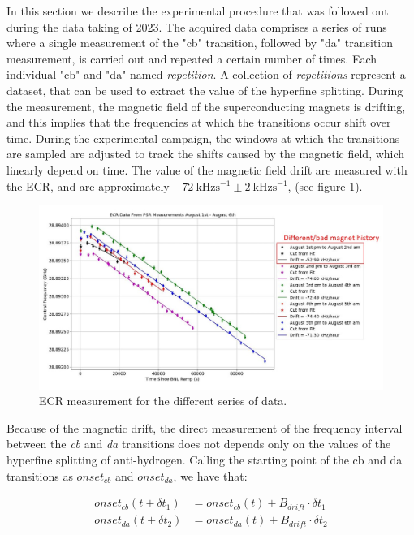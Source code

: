 \documentclass[11pt,a4paper,oneside]{article}
\begin{document}
In this section we describe the experimental procedure that was followed out during the data taking of 2023. 
The acquired data comprises a series of runs where a single measurement of the "cb" transition, followed by "da" transition measurement, is carried out and repeated a certain number of times. Each individual "cb" and "da" named \textit{repetition}. A collection of \textit{repetitions} represent a dataset, that can be used to extract the value of the hyperfine splitting.  During the measurement, the magnetic field of the superconducting magnets is drifting, and this implies that the frequencies at which the transitions occur shift over time. During the experimental campaign, the windows at which the transitions are sampled are adjusted to track the shifts caused by the magnetic field, which linearly depend on time.
The value of the magnetic field drift are measured with the ECR, and are approximately $ \SI{-72}{\kilo \hertz \second\tothe{-1}} \pm \SI{2}{\kilo \hertz \second\tothe{-1}}$, (see figure \ref{fig:ECR}).

\begin{figure}[!h]
\centering
\includegraphics[width = \textwidth]{ECR.jpg}
\caption{ECR measurement for the different series of data.}
\label{fig:ECR}
\end{figure}

Because of the magnetic drift, the direct measurement of the frequency interval between the \textit{cb} and \textit{da} transitions does not depends only on the values of the hyperfine splitting of anti-hydrogen. Calling the starting point of the cb and da transitions as $onset_{cb}$ and $onset_{da}$, we have that:

\begin{align*}
onset_{cb}(t + \delta t_{1}) &= onset_{cb} (t) + B_{drift} \cdot \delta t_{1} \\
onset_{da}(t + \delta t_{2}) &= onset_{da} (t) + B_{drift} \cdot \delta t_{2}
\end{align*}
\end{document}
